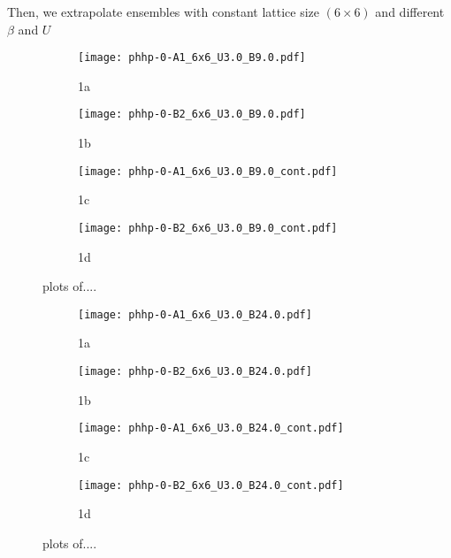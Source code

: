 Then, we extrapolate ensembles with constant lattice size $(6\times6)$ and different $\beta$ and $U$ 
\begin{figure}
  \begin{subfigure}{.5\textwidth}
    \centering
    \texttt{[image: phhp-0-A1\_6x6\_U3.0\_B9.0.pdf]}
    \caption{1a}
    \label{fig:sfig1}
  \end{subfigure}%
  \begin{subfigure}{.5\textwidth}
    \centering
    \texttt{[image: phhp-0-B2\_6x6\_U3.0\_B9.0.pdf]}
    \caption{1b}
    \label{fig:sfig2}
  \end{subfigure}
  \begin{subfigure}{.5\textwidth}
      \centering
      \texttt{[image: phhp-0-A1\_6x6\_U3.0\_B9.0\_cont.pdf]}
      \caption{1c}
      \label{fig:sfig3}
  \end{subfigure}
  \begin{subfigure}{.5\textwidth}
      \centering
      \texttt{[image: phhp-0-B2\_6x6\_U3.0\_B9.0\_cont.pdf]}
      \caption{1d}
      \label{fig:sfig4}
  \end{subfigure}
  \caption{plots of....}
  \label{fig:fig}
\end{figure}

\begin{figure}
  \begin{subfigure}{.5\textwidth}
    \centering
    \texttt{[image: phhp-0-A1\_6x6\_U3.0\_B24.0.pdf]}
    \caption{1a}
    \label{fig:sfig1}
  \end{subfigure}%
  \begin{subfigure}{.5\textwidth}
    \centering
    \texttt{[image: phhp-0-B2\_6x6\_U3.0\_B24.0.pdf]}
    \caption{1b}
    \label{fig:sfig2}
  \end{subfigure}
  \begin{subfigure}{.5\textwidth}
      \centering
      \texttt{[image: phhp-0-A1\_6x6\_U3.0\_B24.0\_cont.pdf]}
      \caption{1c}
      \label{fig:sfig3}
  \end{subfigure}
  \begin{subfigure}{.5\textwidth}
      \centering
      \texttt{[image: phhp-0-B2\_6x6\_U3.0\_B24.0\_cont.pdf]}
      \caption{1d}
      \label{fig:sfig4}
  \end{subfigure}
  \caption{plots of....}
  \label{fig:fig}
\end{figure}

